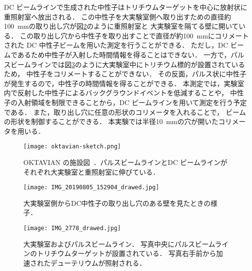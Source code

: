\documentclass[../master]{subfiles}
\begin{document}
DC ビームラインで生成された中性子はトリチウムターゲットを中心に放射状に重照射室へ放出される．
この中性子を大実験室側へ取り出すための直径約\SI{100}{\milli\metre}の取り出し穴が図\ref{pic::hole}のように重照射室と
大実験室を隔てる壁に開いている．
この取り出し穴から中性子を取り出すことで直径が約\SI{100}{\milli\metre}にコリメートされた
DC 中性子ビームを用いた測定を行うことができる．
ただし，DC ビームであるため中性子が入射した時間情報を得ることはできない．
一方で，パルスビームラインでは図\ref{pic::pulse_beam_line}のように大実験室中にトリチウム標的が設置されているため，
中性子をコリメートすることができない．
その反面，パルス状に中性子が発生するので，中性子の時間情報を得ることができる．
本測定では，実験室内で反射した中性子によるバックグラウンドイベントを低減することや，
中性子の入射領域を制限できることから，DC ビームラインを用いて測定を行う予定である．
また，取り出し穴に任意の形状のコリメータを入れることで，
ビームの形状を制御することができる．
本実験では半径\SI{10}{\milli\metre}の穴が開いたコリメータを用いる．
\begin{figure}
  \centering
  \texttt{[image: oktavian-sketch.png]}
  \caption[OKTAVIAN の施設図．]
          {OKTAVIAN の施設図~\cite{oktavian}．パルスビームラインとDC ビームラインがそれぞれ大実験室と重照射室に伸びている．}
  \label{pic::oktavian-sketch}
\end{figure}
\begin{figure}[h]
  \centering
  \texttt{[image: IMG\_20190805\_152904\_drawed.jpg]}
  \caption{大実験室側からDC中性子の取り出し穴のある壁を見たときの様子．}
  \label{pic::hole}
\end{figure}
\begin{figure}[h]
  \centering
  \texttt{[image: IMG\_2778\_drawed.jpg]}
  \caption[大実験室およびパルスビームライン．]
          {大実験室およびパルスビームライン．
            写真中央にパルスビームラインのトリチウムターゲットが設置されている．
          写真右手前から加速されたデューテリウムが照射される．}
  \label{pic::pulse_beam_line}
\end{figure}
\end{document}
